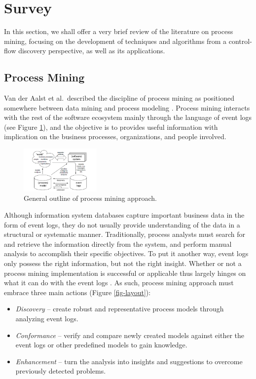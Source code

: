 \documentclass[conference]{IEEEtran}
\begin{document}
\section{Survey}
\label{section-survey}

In this section, we shall offer a very brief review of the literature
on process mining, focusing on the development of techniques
and algorithms from a control-flow discovery perspective, as well as
 its applications.

\subsection{Process Mining}

Van der Aalst et al.~described the discipline of process mining as positioned
somewhere between data mining and process modeling
\cite{van2004}. Process mining interacts with the rest of the software
ecosystem
mainly through the language of event logs (see Figure \ref{fig-outline}),
and the objective is to provides useful information
with implication on the business processes, organizations, and people involved.

\begin{figure}[htbp]
\centerline{\includegraphics[width=0.35\textwidth]{images/image2a.png}}
\caption{General outline of process mining approach.}
\label{fig-outline}
\end{figure}

Although information system databases capture important business data
in the form of event logs, they do not
usually provide understanding of the data in a structural or systematic manner.
Traditionally, process analysts must search for and
retrieve the information directly from the system, and perform manual
analysis to accomplish their specific objectives.
To put it another way, event logs only possess
the right information, but not the right insight.
Whether or not a process mining implementation is successful or applicable
thus largely hinges on what it can do with the event logs
\cite{van2012}. As such, process mining approach must
embrace three main actions (Figure \ref{fig-layout}):

\begin{itemize}
\item \textit{Discovery} --
create robust and representative process models through
 analyzing event logs.

\item \textit{Conformance} -- verify and compare newly created
models against either the event logs or other predefined models
to gain knowledge.

\item \textit{Enhancement} -- turn the analysis 
into insights and suggestions to overcome previously
detected problems.
\end{itemize}
\end{document}
